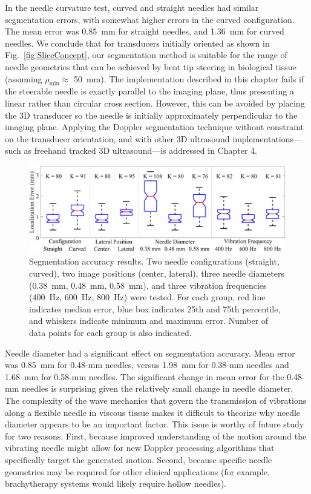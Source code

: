 In the needle curvature test, curved and straight needles had similar segmentation errors, with somewhat higher errors in the curved configuration. The mean error was 0.85~mm for straight needles, and 1.36~mm for curved needles. We conclude that for transducers initially oriented as shown in Fig.~\ref{fig:SliceConcept}, our segmentation method is suitable for the range of needle geometries that can be achieved by bent tip steering in biological tissue (assuming $\rho_{\text{min}} \approx$ 50~mm). The implementation described in this chapter fails if the steerable needle is exactly parallel to the imaging plane, thus presenting a linear rather than circular cross section. However, this can be avoided by placing the 3D transducer so the needle is initially approximately perpendicular to the imaging plane. Applying the Doppler segmentation technique without constraint on the transducer orientation, and with other 3D ultrasound implementations---such as freehand tracked 3D ultrasound---is addressed in Chapter 4.

\begin{figure}[!t]
\centering
\includegraphics[width=\textwidth]{Images/Chapter2/SegmentationAccuracy/SegmentationAccuracy}%
\caption[Doppler segmentation accuracy results]{Segmentation accuracy results. Two needle configurations (straight, curved), two image positions (center, lateral), three needle diameters (0.38~mm, 0.48~mm, 0.58~mm), and three vibration frequencies (400~Hz, 600~Hz, 800~Hz) were tested. For each group, red line indicates median error, blue box indicates 25th and 75th percentile, and whiskers indicate minimum and maximum error. Number of data points for each group is also indicated.}
\label{fig:SegmentationError}
\end{figure}

Needle diameter had a significant effect on segmentation accuracy. Mean error was 0.85~mm for 0.48-mm needles, versus 1.98~mm for 0.38-mm needles and 1.68~mm for 0.58-mm needles. The significant change in mean error for the 0.48-mm needles is surprising given the relatively small change in needle diameter. The complexity of the wave mechanics that govern the transmission of vibrations along a flexible needle in viscous tissue makes it difficult to theorize why needle diameter appears to be an important factor. This issue is worthy of future study for two reasons. First, because improved understanding of the motion around the vibrating needle might allow for new Doppler processing algorithms that specifically target the generated motion. Second, because specific needle geometries may be required for other clinical applications (for example, brachytherapy systems would likely require hollow needles).


